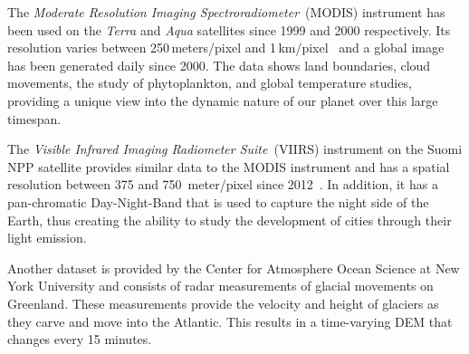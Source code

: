 \documentclass[journal]{vgtc}                %
\begin{document}
The \emph{Moderate Resolution Imaging Spectroradiometer}~(MODIS) instrument has been used on the \emph{Terra} and \emph{Aqua} satellites since 1999 and 2000 respectively.
Its resolution varies between 250\,meters/pixel and 1\,km/pixel~\cite{salomonson1989modis, justice2002overview} and a global image has been generated daily since 2000.
The data shows land boundaries, cloud movements, the study of phytoplankton, and global temperature studies, providing a unique view into the dynamic nature of our planet over this large timespan.

The \emph{Visible Infrared Imaging Radiometer Suite}~(VIIRS) instrument on the Suomi NPP satellite provides similar data to the MODIS instrument and has a spatial resolution between 375 and 750 \,meter/pixel since 2012~\cite{schueler2002npoess}.
In addition, it has a pan-chromatic Day-Night-Band that is used to capture the night side of the Earth, thus creating the ability to study the development of cities through their light emission.

Another dataset is provided by the Center for Atmosphere Ocean Science at New York University and consists of radar measurements of glacial movements on Greenland. These measurements provide the velocity and height of glaciers as they carve and move into the Atlantic. This results in a time-varying DEM that changes every 15 minutes.
\end{document}
